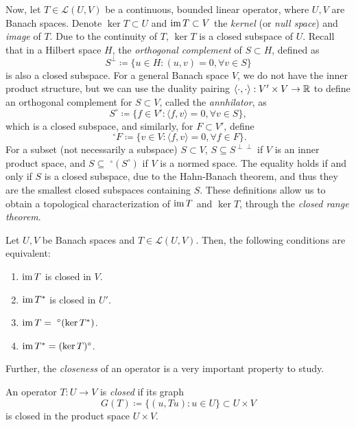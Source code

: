 Now, let $T\in \mathcal{L}(U,V)$ be a continuous, bounded linear operator, where $U,V$ are Banach spaces. Denote $\ker T\subset U$ and $\operatorname{\text{im}} T\subset V$ the \emph{kernel} (or \emph{null space}) and \emph{image} of $T$. Due to the continuity of $T$, $\ker T$ is a closed subspace of $U$. Recall that in a Hilbert space $H$, the \emph{orthogonal complement} of $S\subset H$, defined as
\begin{equation*}
    S^\perp \coloneqq \{u\in H: (u,v)=0,\forall v\in S\}
\end{equation*}
is also a closed subspace. For a general Banach space $V$, we do not have the inner product structure, but we can use the duality pairing $\langle\cdot,\cdot\rangle:V'\times V\to \mathbb{R}$ to define an orthogonal complement for $S\subset V$, called the \emph{annhilator}, as 
\begin{equation*}
    S^\circ \coloneqq \{f\in V': \langle f, v\rangle = 0,\forall v\in S\},
\end{equation*}
which is a closed subspace, and similarly, for $F\subset V'$, define
\begin{equation*}
    \phantom{.}^\circ F \coloneqq \{v\in V:\langle f,v\rangle = 0,\forall f\in F\}.
\end{equation*}
For a subset (not necessarily a subspace) $S\subset V$, $S\subseteq S^{\perp\perp}$ if $V$ is an inner product space, and $S\subseteq\phantom{.}^\circ(S^\circ)$ if $V$ is a normed space. The equality holds if and only if $S$ is a closed subspace, due to the Hahn-Banach theorem, and thus they are the smallest closed subspaces containing $S$. These definitions allow us to obtain a topological characterization of $\operatorname{\text{im}} T$ and $\ker T$, through the \emph{closed range theorem}. 
\begin{theorem}\label{thm:closed-range-theorem}
    Let $U,V$ be Banach spaces and $T\in\mathcal{L}(U,V)$. Then, the following conditions are equivalent: 
    \begin{enumerate}
        \item $\operatorname{\text{im}} T$ is closed in $V$. 
        \item $\operatorname{\text{im}} T^*$ is closed in $U'$.
        \item $\operatorname{\text{im}} T = \phantom{.}^\circ (\ker T^*)$.
        \item $\operatorname{\text{im}} T^* = (\ker T)^\circ$.
    \end{enumerate}
\end{theorem}

Further, the \emph{closeness} of an operator is a very important property to study.
\begin{definition}
    An operator $T:U\to V$ is \emph{closed} if its graph 
    \begin{equation}
        G(T) \coloneqq \{(u,Tu):u\in U\}\subset U\times V
    \end{equation}
    is closed in the product space $U\times V$.
\end{definition}

